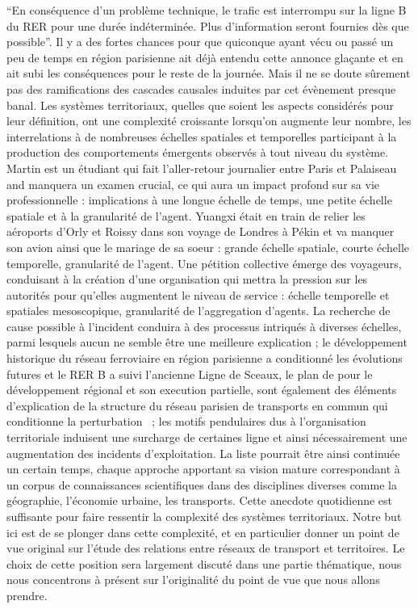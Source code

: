 {}{
``En conséquence d'un problème technique, le trafic est interrompu sur la ligne B du RER pour une durée indéterminée. Plus d'information seront fournies dès que possible''. Il y a des fortes chances pour que quiconque ayant vécu ou passé un peu de temps en région parisienne ait déjà entendu cette annonce glaçante et en ait subi les conséquences pour le reste de la journée. Mais il ne se doute sûrement pas des ramifications des cascades causales induites par cet évènement presque banal. Les systèmes territoriaux, quelles que soient les aspects considérés pour leur définition, ont une complexité croissante lorsqu'on augmente leur nombre, les interrelations à de nombreuses échelles spatiales et temporelles participant à la production des comportements émergents observés à tout niveau du système. Martin est un étudiant qui fait l'aller-retour journalier entre Paris et Palaiseau and manquera un examen crucial, ce qui aura un impact profond sur sa vie professionnelle : implications à une longue échelle de temps, une petite échelle spatiale et à la granularité de l'agent. Yuangxi était en train de relier les aéroports d'Orly et Roissy dans son voyage de Londres à Pékin et va manquer son avion ainsi que le mariage de sa soeur : grande échelle spatiale, courte échelle temporelle, granularité de l'agent. Une pétition collective émerge des voyageurs, conduisant à la création d'une organisation qui mettra la pression sur les autorités pour qu'elles augmentent le niveau de service : échelle temporelle et spatiales mesoscopique, granularité de l'aggregation d'agents. La recherche de cause possible à l'incident conduira à des processus intriqués à diverses échelles, parmi lesquels aucun ne semble être une meilleure explication ; le développement historique du réseau ferroviaire en région parisienne a conditionné les évolutions futures et le RER B a suivi l'ancienne Ligne de Sceaux, le plan de  pour le développement régional et son execution partielle, sont également des éléments d'explication de la structure du réseau parisien de transports en commun qui conditionne la perturbation~\cite{gleyze2005vulnerabilite} ; les motifs pendulaires dus à l'organisation territoriale induisent une surcharge de certaines ligne et ainsi nécessairement une augmentation des incidents d'exploitation. La liste pourrait être ainsi continuée un certain temps, chaque approche apportant sa vision mature correspondant à un corpus de connaissances scientifiques dans des disciplines diverses comme la géographie, l'économie urbaine, les transports. Cette anecdote quotidienne est suffisante pour faire ressentir la complexité des systèmes territoriaux. Notre but ici est de se plonger dans cette complexité, et en particulier donner un point de vue original sur l'étude des relations entre réseaux de transport et territoires. Le choix de cette position sera largement discuté dans une partie thématique, nous nous concentrons à présent sur l'originalité du point de vue que nous allons prendre.
}





